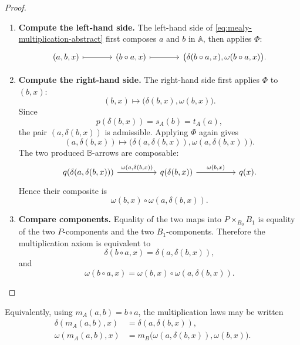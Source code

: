 \begin{proof}
\begin{enumerate}
        \item \textbf{Compute the left-hand side.} The left-hand side of \eqref{eq:mealy-multiplication-abstract} first composes \(a\) and \(b\) in \(\mathbb A\), then applies \(\Phi\):
        \[
            \begin{tikzcd}[column sep=large]
                    (a,b,x)
                        \arrow[r, maps to]
                &
                    (b\circ a,x)
                        \arrow[r, maps to]
                &
                    \bigl(\delta(b\circ a,x),\omega(b\circ a,x)\bigr).
            \end{tikzcd}
        \]

        \item \textbf{Compute the right-hand side.} The right-hand side first applies \(\Phi\) to \((b,x)\):
        \[
            (b,x)
            \longmapsto
            \bigl(\delta(b,x),\omega(b,x)\bigr).
        \]
        Since
        \[
            p(\delta(b,x))=s_A(b)=t_A(a),
        \]
        the pair \((a,\delta(b,x))\) is admissible. Applying \(\Phi\) again gives
        \[
            (a,\delta(b,x))
            \longmapsto
            \bigl(\delta(a,\delta(b,x)),\omega(a,\delta(b,x))\bigr).
        \]
        The two produced \(\mathbb B\)-arrows are composable:
        \[
            \begin{tikzcd}[column sep=huge]
                    {q(\delta(a,\delta(b,x)))}
                        \arrow[r, "{\omega(a,\delta(b,x))}"]
                &
                    {q(\delta(b,x))}
                        \arrow[r, "{\omega(b,x)}"]
                &
                    {q(x)}.
            \end{tikzcd}
        \]
        Hence their composite is
        \[
            \omega(b,x)\circ\omega(a,\delta(b,x)).
        \]

        \item \textbf{Compare components.} Equality of the two maps into \(P\times_{B_0}B_1\) is equality of the two \(P\)-components and the two \(B_1\)-components. Therefore the multiplication axiom is equivalent to
        \[
            \delta(b\circ a,x)
            =
            \delta(a,\delta(b,x)),
        \]
        and
        \[
            \omega(b\circ a,x)
            =
            \omega(b,x)\circ \omega(a,\delta(b,x)).
        \]
    \end{enumerate}
\end{proof}

Equivalently, using \(m_A(a,b)=b\circ a\), the multiplication laws may be written
\begin{align}
    \delta(m_A(a,b),x)
    &=
    \delta(a,\delta(b,x)),
    \label{eq:delta-composition-m}
    \\
    \omega(m_A(a,b),x)
    &=
    m_B\bigl(\omega(a,\delta(b,x)),\omega(b,x)\bigr).
    \label{eq:omega-composition-m}
\end{align}

